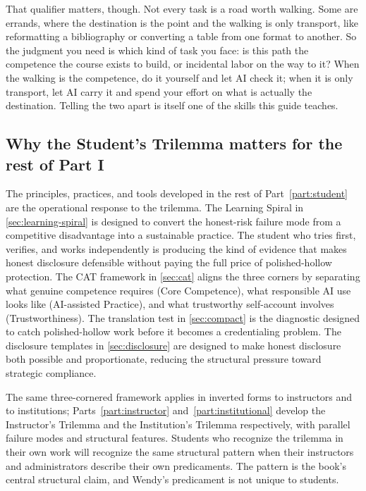 \documentclass{SIAMbook2023}
\begin{document}
That qualifier matters, though. Not every task is a road worth walking. Some are errands, where the destination is the point and the walking is only transport, like reformatting a bibliography or converting a table from one format to another. So the judgment you need is which kind of task you face: is this path the competence the course exists to build, or incidental labor on the way to it? When the walking is the competence, do it yourself and let AI check it; when it is only transport, let AI carry it and spend your effort on what is actually the destination. Telling the two apart is itself one of the skills this guide teaches.

\subsection{Why the Student's Trilemma matters for the rest of Part I}
\label{subsec:trilemma-stakes}

The principles, practices, and tools developed in the rest of Part~\ref{part:student} are the operational response to the trilemma. The Learning Spiral in \cref{sec:learning-spiral} is designed to convert the honest-risk failure mode from a competitive disadvantage into a sustainable practice. The student who tries first, verifies, and works independently is producing the kind of evidence that makes honest disclosure defensible without paying the full price of polished-hollow protection. The CAT framework in \cref{sec:cat} aligns the three corners by separating what genuine competence requires (Core Competence), what responsible AI use looks like (AI-assisted Practice), and what trustworthy self-account involves (Trustworthiness). The translation test in \cref{sec:compact} is the diagnostic designed to catch polished-hollow work before it becomes a credentialing problem. The disclosure templates in \cref{sec:disclosure} are designed to make honest disclosure both possible and proportionate, reducing the structural pressure toward strategic compliance.

The same three-cornered framework applies in inverted forms to instructors and to institutions; Parts~\ref{part:instructor} and~\ref{part:institutional} develop the Instructor's Trilemma and the Institution's Trilemma respectively, with parallel failure modes and structural features. Students who recognize the trilemma in their own work will recognize the same structural pattern when their instructors and administrators describe their own predicaments. The pattern is the book's central structural claim, and Wendy's predicament is not unique to students.
\end{document}
